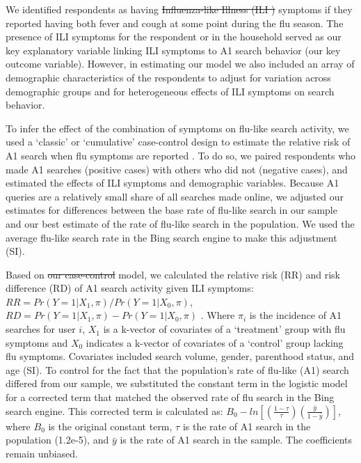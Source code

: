 \documentclass[fleqn,10pt]{wlscirep}
\providecommand{\DIFadd}[1]{{\protect\color{blue}\uwave{#1}}} %
\providecommand{\DIFdel}[1]{{\protect\color{red}\sout{#1}}}                      %
\providecommand{\DIFaddbegin}{} %
\providecommand{\DIFaddend}{} %
\providecommand{\DIFdelbegin}{} %
\providecommand{\DIFdelend}{} %
\begin{document}
We identified respondents as having \DIFdelbegin \DIFdel{Influenza-like Illness (ILI ) }\DIFdelend \DIFaddbegin \DIFadd{ILI }\DIFaddend symptoms if they reported having both fever and cough at some point during the flu season. The presence of ILI symptoms for the respondent or in the household served as our key explanatory variable linking ILI symptoms to A1 search behavior (our key outcome variable). However, in estimating our model we also included an array of demographic characteristics of the respondents to adjust for variation across demographic groups and for heterogeneous effects of ILI symptoms on search behavior.

To infer the effect of the combination of symptoms on flu-like search activity, we used a `classic' or `cumulative' case-control design to estimate the relative risk of A1 search when flu symptoms are reported \cite{king_and_zeng_2001}. To do so, we paired respondents who made A1 searches (positive cases) with others who did not (negative cases), and estimated the effects of ILI symptoms and demographic variables. Because A1 queries are a relatively small share of all searches made online, we adjusted our estimates for differences between the base rate of flu-like search in our sample and our best estimate of the rate of flu-like search in the population. We used the average flu-like search rate in the Bing search engine to make this adjustment (SI\DIFaddbegin \DIFadd{: 6}\DIFaddend ). 

Based on \DIFdelbegin \DIFdel{our case-control }\DIFdelend \DIFaddbegin \DIFadd{this }\DIFaddend model, we calculated the relative risk (RR) and risk difference (RD) of A1 search activity given ILI symptoms: $ RR = Pr(Y=1|X_1, \pi) / Pr(Y=1|X_0, \pi) $, $ RD = Pr(Y=1|X_1, \pi) - Pr(Y=1|X_0, \pi) $ \cite{king_and_zeng_2001}. Where $\pi_i$ is the incidence of A1 searches for user $i$, $X_1$ is a k-vector of covariates of a `treatment' group with flu symptoms and $X_0$ indicates a k-vector of covariates of a `control' group lacking flu symptoms. Covariates included search volume, gender, parenthood status, and age (SI\DIFaddbegin \DIFadd{: 3.4}\DIFaddend ). To control for the fact that the population's rate of flu-like (A1) search differed from our sample, we substituted the constant term in the logistic model for a corrected term that matched the observed rate of flu search in the Bing search engine. This corrected term is calculated as: $B_0 - ln[ (\frac{1-\tau}{\tau}) (\frac{\bar{y}}{1-\bar{y}}) ]$, where $B_0$ is the original constant term, $\tau$ is the rate of A1 search in the population (1.2e-5), and $\bar{y}$ is the rate of A1 search in the sample. The coefficients remain unbiased. 
\end{document}
